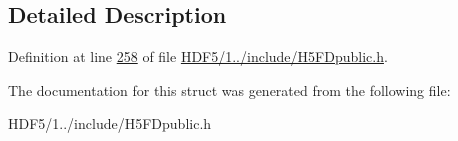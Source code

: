 \subsection{Detailed Description}


Definition at line \hyperlink{_h_d_f5_21_810_81_2include_2_h5_f_dpublic_8h_source_l00258}{258} of file \hyperlink{_h_d_f5_21_810_81_2include_2_h5_f_dpublic_8h_source}{H\+D\+F5/1../include/\+H5\+F\+Dpublic.\+h}.



The documentation for this struct was generated from the following file\+:\begin{DoxyCompactItemize}
\item 
H\+D\+F5/1../include/\+H5\+F\+Dpublic.\+h\end{DoxyCompactItemize}
